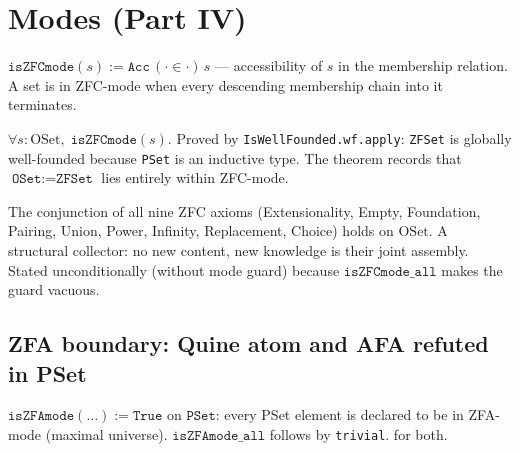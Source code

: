 \section{Modes (Part IV)}
\label{sec:sets_modes}

\begin{definition}
\label{def:isZFCmode}
\leanok
{}
$\texttt{isZFCmode}(s) := \texttt{Acc}\,({\cdot} \in {\cdot})\,s$
--- accessibility of $s$ in the membership relation.  A set is in
ZFC-mode when every descending membership chain into it terminates.
\end{definition}

\begin{theorem}
\label{thm:isZFCmode_all}
\leanok
{}
$\forall s : \mathrm{OSet},\; \texttt{isZFCmode}(s)$.
Proved by \texttt{IsWellFounded.wf.apply}: \texttt{ZFSet} is globally
well-founded because \texttt{PSet} is an inductive type.  The theorem
records that $\texttt{OSet} := \texttt{ZFSet}$ lies entirely within
ZFC-mode.
\end{theorem}

\begin{theorem}
\label{thm:Theorem_IV_1}
\leanok
{}
The conjunction of all nine ZFC axioms (Extensionality, Empty, Foundation,
Pairing, Union, Power, Infinity, Replacement, Choice) holds on
$\mathrm{OSet}$.  A structural collector: no new content, new knowledge
is their joint assembly.  Stated unconditionally (without mode guard)
because $\texttt{isZFCmode\_all}$ makes the guard vacuous.
\end{theorem}

\subsection{ZFA boundary: Quine atom and AFA refuted in PSet}
\label{subsec:zfa_refuted}

\begin{definition}
\label{def:isZFAmode}
\leanok
{}
$\texttt{isZFAmode}(\ldots) := \texttt{True}$ on $\texttt{PSet}$: every
PSet element is declared to be in ZFA-mode (maximal universe).
$\texttt{isZFAmode\_all}$ follows by \texttt{trivial}.
\axiomprofile{[]} for both.
\end{definition}

